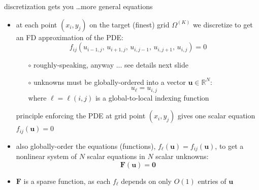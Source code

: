 \documentclass[10pt,
               svgnames,
               hyperref={colorlinks,citecolor=DeepPink4,linkcolor=FireBrick,urlcolor=Maroon},
               usepdftitle=false]{beamer}
\newcommand{\bu}{\mathbf{u}}
\newcommand{\bF}{\mathbf{F}}
\newcommand{\bzero}{\bm{0}}
\newcommand{\RR}{\mathbb{R}}
\begin{document}
\begin{frame}{discretization gets you \dots more general equations}
\begin{itemize}
\item at each point $(x_i,y_j)$ on the target (finest) grid $\Omega^{(K)}$ we discretize to get an FD approximation of the PDE:
    $$f_{ij}(u_{i-1,j},\,u_{i+1,j},\,u_{i,j-1},\,u_{i,j+1},\,u_{i,j}) = 0$$

	\begin{itemize}
	\item[$\circ$] roughly-speaking, anyway ... see details next slide
	\item[$\circ$] unknowns must be globally-ordered into a vector $\bu \in \RR^N$:
	    $$u_\ell = u_{i,j}$$
    where $\ell=\ell(i,j)$ is a global-to-local indexing function
	\end{itemize}

\medskip
\begin{block}{principle}
enforcing the PDE at grid point $(x_i,y_j)$ gives one scalar equation $f_{ij}(\bu) = 0$
\end{block}

\bigskip
\item also globally-order the equations (functions), $f_\ell(\bu) = f_{ij}(\bu)$, to get a nonlinear system of $N$ scalar equations in $N$ scalar unknowns:
    $$\bF(\bu) = \bzero$$
\item $\bF$ is a sparse function, as each $f_\ell$ depends on only $O(1)$ entries of $\bu$
\end{itemize}
\end{frame}
\end{document}
